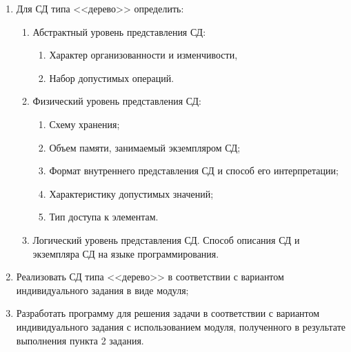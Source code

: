 \documentclass[12pt]{article}
\begin{document}
	\begin{enumerate}
	
	\item Для СД типа <<дерево>> определить:
	
		\begin{enumerate}
	
			\item Абстрактный уровень представления СД:
			
			\begin{enumerate}
	
				\item Характер организованности и изменчивости, 
	
				\item Набор допустимых операций.
			
			\end{enumerate}
	
			\item Физический уровень представления СД:
			
			\begin{enumerate}
	
				\item Схему хранения;
	
				\item Объем памяти, занимаемый экземпляром СД;
	
				\item Формат внутреннего представления СД и способ его  интерпретации;
				
				\item Характеристику допустимых значений;
				
				\item Тип доступа к элементам.
				
			\end{enumerate}
			
			\item Логический уровень представления СД. Способ описания СД и экземпляра СД на языке программирования.
	
		\end{enumerate}
	
	\item Реализовать СД типа <<дерево>> в соответствии с вариантом индивидуального задания в виде модуля;
	
	\item Разработать программу для решения задачи в соответствии с вариантом индивидуального задания с использованием модуля, полученного в результате выполнения пункта 2 задания.
	
	\end{enumerate}
	
\end{document}
